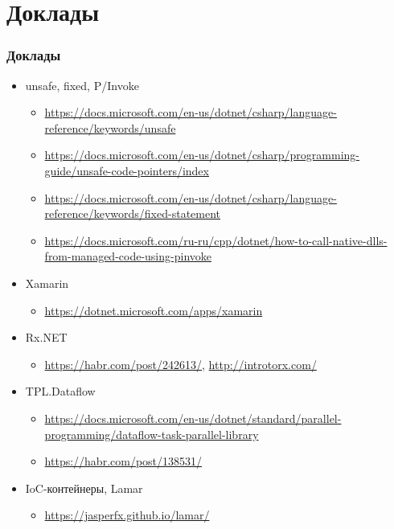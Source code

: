 \documentclass{../../slides-style}
\begin{document}
    \begin{frame}[plain]
        \titlepage
    \end{frame}

    \section{Доклады}

    \begin{frame}
        \frametitle{Доклады}
        \begin{itemize}
            \item unsafe, fixed, P/Invoke
            \begin{itemize}
                \footnotesize
                \item \url{https://docs.microsoft.com/en-us/dotnet/csharp/language-reference/keywords/unsafe}
                \item \url{https://docs.microsoft.com/en-us/dotnet/csharp/programming-guide/unsafe-code-pointers/index}
                \item \url{https://docs.microsoft.com/en-us/dotnet/csharp/language-reference/keywords/fixed-statement}
                \item \url{https://docs.microsoft.com/ru-ru/cpp/dotnet/how-to-call-native-dlls-from-managed-code-using-pinvoke}
            \end{itemize}
            \item Xamarin
            \begin{itemize}
                \footnotesize
                \item \url{https://dotnet.microsoft.com/apps/xamarin}
            \end{itemize}
            \item Rx.NET
            \begin{itemize}
                \footnotesize
                \item \url{https://habr.com/post/242613/}, \url{http://introtorx.com/}
            \end{itemize}
            \item TPL.Dataflow
            \begin{itemize}
                \footnotesize
                \item \url{https://docs.microsoft.com/en-us/dotnet/standard/parallel-programming/dataflow-task-parallel-library}
                \item \url{https://habr.com/post/138531/}
            \end{itemize}
            \item IoC-контейнеры, Lamar
            \begin{itemize}
                \footnotesize
                \item \url{https://jasperfx.github.io/lamar/}
            \end{itemize}
        \end{itemize}
    \end{frame}
\end{document}
